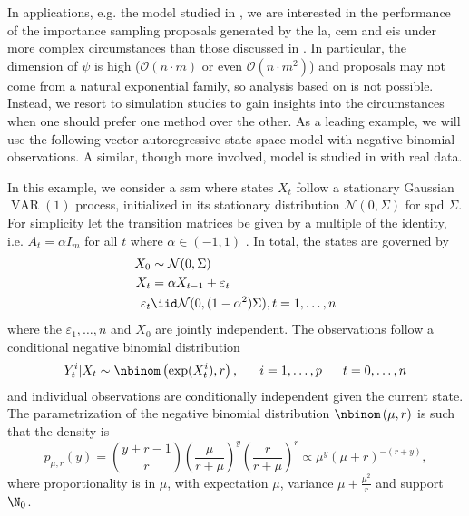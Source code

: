 
In applications, e.g. the model studied in , we are interested in the performance of the importance sampling proposals generated by the \gls{la}, \gls{cem} and \gls{eis} under more complex circumstances than those discussed in . In particular, the dimension of $\psi$ is high ($\mathcal O(n \cdot m)$ or even $\mathcal O(n \cdot m^{2})$) and proposals may not come from a natural exponential family, so analysis based on  is not possible.  Instead, we resort to simulation studies to gain insights into the circumstances when one should prefer one method over the other.
As a leading example, we will use the following vector-autoregressive state space model with negative binomial observations. A similar, though more involved, model is studied in  with real data.

\begin{example}
    \label{ex:negbinom-ar1}
    In this example, we consider a \gls{ssm} where states $X_{t}$ follow a stationary Gaussian $\operatorname{VAR}(1)$ process, initialized in its stationary distribution $\mathcal N(0,\Sigma)$ for \acrshort{spd} $\Sigma$. For simplicity let the transition matrices be given by a multiple of the identity, i.e. $A_{t} = \alpha I_{m}$ for all $t$ where $\alpha \in (-1, 1)$ . 
    In total, the states are governed by
    \begin{align*}
    X_{0} &\sim \mathcal N(0,\Sigma) \\
    X_{t} &= \alpha X_{t - 1} + \varepsilon_{t}\\
    \varepsilon_t &\iid \mathcal N(0, (1 - \alpha^{2})\Sigma), t = 1, \dots, n
    \end{align*}
    where the $\varepsilon_{1}, \dots, n$ and $X_{0}$ are jointly independent. The observations follow a conditional negative binomial distribution 
    $$
    Y^{i}_{t} | X_{t} \sim \nbinom \left( \exp(X^{i}_{t}), r \right), \phantom{and} i = 1, \dots, p \phantom{and} t = 0, \dots, n
    $$
    and individual observations are conditionally independent given the current state. The parametrization of the negative binomial distribution $\nbinom \left( \mu, r \right)$ is such that the density is
    $$
        p_{\mu, r}(y) = \binom{y + r - 1}{r} \left( \frac{\mu}{r + \mu} \right)^{y} \left( \frac{r}{r + \mu} \right)^{r} \propto \mu^{y} (\mu + r)^{-(r + y)},
    $$
    where proportionality is in $\mu$, with expectation $\mu$, variance $\mu + \frac{\mu^{2}}{r}$ and support $\N_{0}$. 
\end{example}

